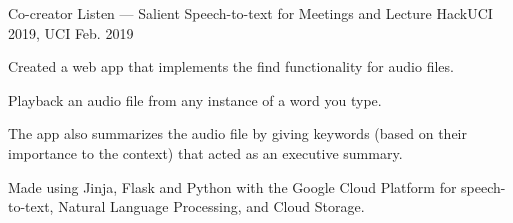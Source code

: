 \begin{cventries}

\cventry
    {Co-creator} %
    {Listen — Salient Speech-to-text for Meetings and Lecture} %
    {HackUCI 2019, UCI} %
    {Feb. 2019} %
    {
      \begin{cvitems} %
        \item {Created a web app that implements the find functionality for audio files.}
        \item{Playback an audio file from any instance of a word you type.}
        \item{The app also summarizes the audio file by giving keywords (based on their importance to the context) that acted as an executive summary.}
        \item{Made using Jinja, Flask and Python with the Google Cloud Platform for speech-to-text, Natural Language Processing, and Cloud Storage.}
      \end{cvitems}
    }

\end{cventries}
